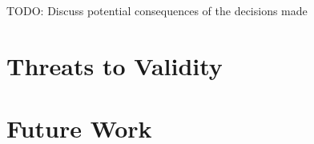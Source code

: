 TODO: Discuss potential consequences of the decisions made

\section{Threats to Validity}
\label{sec:threats-to-validity}


\section{Future Work}
\label{sec:future-work}


